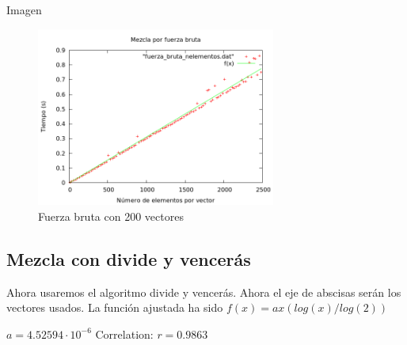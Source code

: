 \begin{frame}{Imagen}
	\begin{exampleblock}
	
	\begin{figure}[h] 
	\includegraphics[width=0.7\textwidth]
	{../Obligatorio/Graficas/fuerza_bruta_nelementos.png}
	\caption{Fuerza bruta con 200 vectores} 
	\end{figure}
	
	\end{exampleblock}
\end{frame}


\subsection{Mezcla con divide y vencer\'as}
\begin{frame}
	\begin{block}
	Ahora usaremos el algoritmo divide y vencerás.
	Ahora el eje de abscisas serán los vectores usados.
	La funci\'on ajustada ha sido $f(x) = ax(log(x)/log(2))$

	\begin{center}	
	$a               = 4.52594\cdot 10^{-6}$
	Correlation:  $r = 0.9863$
	\end{center}
	\end{block}
\end{frame}

